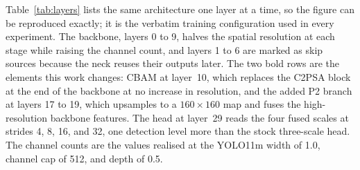 Table~\ref{tab:layers} lists the same architecture one layer at a time, so the
figure can be reproduced exactly; it is the verbatim training configuration
used in every experiment. The backbone, layers 0 to 9, halves the spatial
resolution at each stage while raising the channel count, and layers 1 to 6 are
marked as skip sources because the neck reuses their outputs later. The two
bold rows are the elements this work changes: CBAM at layer~10, which replaces
the C2PSA block at the end of the backbone at no increase in resolution, and
the added P2 branch at layers 17 to 19, which upsamples to a $160\times160$ map
and fuses the high-resolution backbone features. The head at layer~29 reads the
four fused scales at strides 4, 8, 16, and 32, one detection level more than the
stock three-scale head. The channel counts are the values realised at the
YOLO11m width of 1.0, channel cap of 512, and depth of 0.5.

